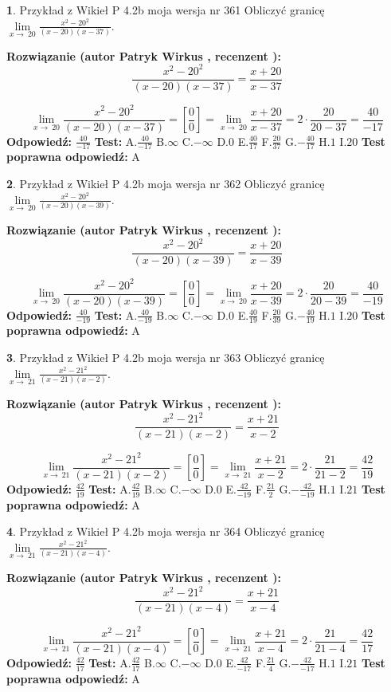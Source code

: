 \documentclass[12pt, a4paper]{article}
\theoremstyle{definition} %
\newtheorem{zad}{}
\newcommand{\zadStart}[1]{\begin{zad}#1\newline}
\newcommand{\zadStop}{\end{zad}}
\newcommand{\rozwStart}[2]{\noindent \textbf{Rozwiązanie (autor #1 , recenzent #2): }\newline}
\newcommand{\rozwStop}{\newline}
\newcommand{\odpStart}{\noindent \textbf{Odpowiedź:}\newline}
\newcommand{\odpStop}{\newline}
\newcommand{\testStart}{\noindent \textbf{Test:}\newline}
\newcommand{\testStop}{\newline}
\newcommand{\kluczStart}{\noindent \textbf{Test poprawna odpowiedź:}\newline}
\newcommand{\kluczStop}{\newline}
\begin{document}
\zadStart{Przykład z Wikieł P 4.2b moja wersja nr 361}
Obliczyć granicę $\lim\limits_{x\to\ 20}\frac{x^{2}-20^{2}}{(x-20)(x-37)}$.
\zadStop
\rozwStart{Patryk Wirkus}{}
$$\frac{x^{2}-20^{2}}{(x-20)(x-37)}=\frac{x+20}{x-37}$$

$$\lim\limits_{x\to\ 20}\frac{x^{2}-20^{2}}{(x-20)(x-37)}=[\frac{0}{0}]=\lim\limits_{x\to\ 20}\frac{x+20}{x-37}=2 \cdot \frac{20}{20-37} = \frac{40}{-17}$$
\rozwStop
\odpStart
$\frac{40}{-17}$
\odpStop
\testStart
A.$\frac{40}{-17}$
B.$\infty$
C.$-\infty$
D.$0$
E.$\frac{40}{17}$
F.$\frac{20}{37}$
G.$-\frac{40}{17}$
H.$1$
I.$20$
\testStop
\kluczStart
A
\kluczStop



\zadStart{Przykład z Wikieł P 4.2b moja wersja nr 362}
Obliczyć granicę $\lim\limits_{x\to\ 20}\frac{x^{2}-20^{2}}{(x-20)(x-39)}$.
\zadStop
\rozwStart{Patryk Wirkus}{}
$$\frac{x^{2}-20^{2}}{(x-20)(x-39)}=\frac{x+20}{x-39}$$

$$\lim\limits_{x\to\ 20}\frac{x^{2}-20^{2}}{(x-20)(x-39)}=[\frac{0}{0}]=\lim\limits_{x\to\ 20}\frac{x+20}{x-39}=2 \cdot \frac{20}{20-39} = \frac{40}{-19}$$
\rozwStop
\odpStart
$\frac{40}{-19}$
\odpStop
\testStart
A.$\frac{40}{-19}$
B.$\infty$
C.$-\infty$
D.$0$
E.$\frac{40}{19}$
F.$\frac{20}{39}$
G.$-\frac{40}{19}$
H.$1$
I.$20$
\testStop
\kluczStart
A
\kluczStop



\zadStart{Przykład z Wikieł P 4.2b moja wersja nr 363}
Obliczyć granicę $\lim\limits_{x\to\ 21}\frac{x^{2}-21^{2}}{(x-21)(x-2)}$.
\zadStop
\rozwStart{Patryk Wirkus}{}
$$\frac{x^{2}-21^{2}}{(x-21)(x-2)}=\frac{x+21}{x-2}$$

$$\lim\limits_{x\to\ 21}\frac{x^{2}-21^{2}}{(x-21)(x-2)}=[\frac{0}{0}]=\lim\limits_{x\to\ 21}\frac{x+21}{x-2}=2 \cdot \frac{21}{21-2} = \frac{42}{19}$$
\rozwStop
\odpStart
$\frac{42}{19}$
\odpStop
\testStart
A.$\frac{42}{19}$
B.$\infty$
C.$-\infty$
D.$0$
E.$\frac{42}{-19}$
F.$\frac{21}{2}$
G.$-\frac{42}{-19}$
H.$1$
I.$21$
\testStop
\kluczStart
A
\kluczStop



\zadStart{Przykład z Wikieł P 4.2b moja wersja nr 364}
Obliczyć granicę $\lim\limits_{x\to\ 21}\frac{x^{2}-21^{2}}{(x-21)(x-4)}$.
\zadStop
\rozwStart{Patryk Wirkus}{}
$$\frac{x^{2}-21^{2}}{(x-21)(x-4)}=\frac{x+21}{x-4}$$

$$\lim\limits_{x\to\ 21}\frac{x^{2}-21^{2}}{(x-21)(x-4)}=[\frac{0}{0}]=\lim\limits_{x\to\ 21}\frac{x+21}{x-4}=2 \cdot \frac{21}{21-4} = \frac{42}{17}$$
\rozwStop
\odpStart
$\frac{42}{17}$
\odpStop
\testStart
A.$\frac{42}{17}$
B.$\infty$
C.$-\infty$
D.$0$
E.$\frac{42}{-17}$
F.$\frac{21}{4}$
G.$-\frac{42}{-17}$
H.$1$
I.$21$
\testStop
\kluczStart
A
\kluczStop
\end{document}
